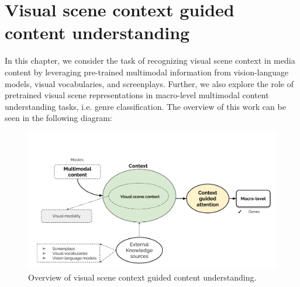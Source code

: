 \chapter{Visual scene context guided content understanding}

In this chapter, we consider the task of recognizing visual scene context in media content by leveraging pre-trained multimodal information from vision-language models, visual vocabularies, and screenplays. Further, we also explore the role of pretrained visual scene representations in macro-level multimodal content understanding tasks, i.e. genre classification. The overview of this work can be seen in the following diagram:

\begin{figure}[h!]
    \centering 
     \includegraphics[width=\linewidth]{figures/visual_scene_context.pdf}
     \caption{Overview of visual scene context guided content understanding.}
     \label{visual_scene_context}
\end{figure}


